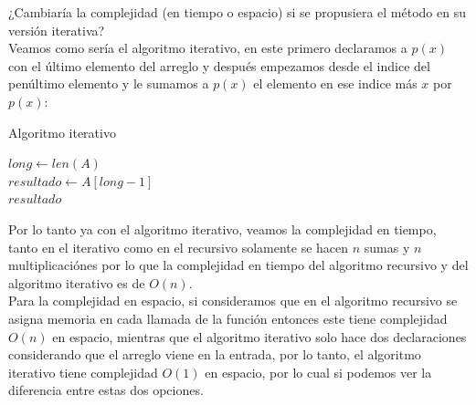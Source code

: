 \documentclass[12pt]{article}
\begin{document}
\begin{itemize}
    ¿Cambiaría la complejidad (en tiempo o espacio) si se propusiera el método en su versión iterativa?\\
    Veamos como sería el algoritmo iterativo, en este primero declaramos a $p(x)$ con el último elemento del arreglo y después empezamos desde el indice del penúltimo elemento y le sumamos a $p(x)$ el elemento en ese indice más $x$ por $p(x)$:\\
    \begin{algorithm}[H]
        \caption{Algoritmo iterativo}
        $long \gets len(A)$\\
        $resultado \gets A[long - 1]$\\
        \Return $resultado$
    \end{algorithm}
    Por lo tanto ya con el algoritmo iterativo, veamos la complejidad en tiempo, tanto en el iterativo como en el recursivo solamente se hacen $n$ sumas y $n$ multiplicaciónes por lo que la complejidad en tiempo del algoritmo recursivo y del algoritmo iterativo es de $O(n)$.\\
    Para la complejidad en espacio, si consideramos que en el algoritmo recursivo se asigna memoria en cada llamada de la función entonces este tiene complejidad $O(n)$ en espacio, mientras que el algoritmo iterativo solo hace dos declaraciones considerando que el arreglo viene en la entrada, por lo tanto, el algoritmo iterativo tiene complejidad $O(1)$ en espacio, por lo cual si podemos ver la diferencia entre estas dos opciones.
\end{itemize}

\end{document}
